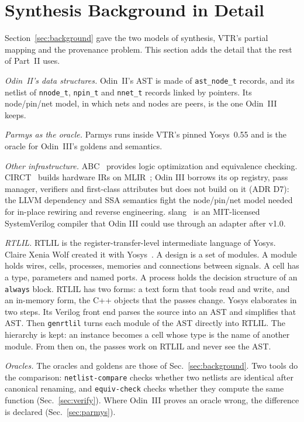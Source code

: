 \documentclass[conference]{IEEEtran}
\newcommand{\code}[1]{\texttt{#1}}
\begin{document}
\section{Synthesis Background in Detail}
\label{sec:background-detail}

Section~\ref{sec:background} gave the two models of synthesis, VTR's partial mapping and the
provenance problem. This section adds the detail that the rest of Part~II uses.

\emph{Odin~II's data structures.} Odin~II's AST is made of \code{ast\_node\_t} records, and its
netlist of \code{nnode\_t}, \code{npin\_t} and \code{nnet\_t} records linked by pointers. Its
node/pin/net model, in which nets and nodes are peers, is the one Odin~III keeps.

\emph{Parmys as the oracle.} Parmys runs inside VTR's pinned Yosys~0.55 and is the oracle for
Odin~III's goldens and semantics.

\emph{Other infrastructure.} ABC~ provides logic optimization and
equivalence checking. CIRCT~ builds hardware IRs on MLIR~;
Odin III borrows its op registry, pass manager, verifiers and first-class attributes but does not
build on it (ADR D7): the LLVM dependency and SSA semantics fight the node/pin/net model needed
for in-place rewiring and reverse engineering. slang~ is an MIT-licensed
SystemVerilog compiler that Odin III could use through an adapter after v1.0.

\emph{RTLIL.} RTLIL is the register-transfer-level intermediate language of Yosys. Claire Xenia
Wolf created it with Yosys~. A design is a set of modules. A module holds wires, cells,
processes, memories and connections between signals. A cell has a type, parameters and named
ports. A process holds the decision structure of an \code{always} block. RTLIL has two forms: a
text form that tools read and write, and an in-memory form, the C++ objects that the passes
change. Yosys elaborates in two steps. Its Verilog front end parses the source into an AST and
simplifies that AST. Then \code{genrtlil} turns each module of the AST directly into RTLIL.
The hierarchy is kept: an instance becomes a cell whose type is the name of another module. From
then on, the passes work on RTLIL and never see the AST.

\emph{Oracles.} The oracles and goldens are those of Sec.~\ref{sec:background}. Two tools do the
comparison: \code{netlist-compare} checks whether two netlists are identical after canonical
renaming, and \code{equiv-check} checks whether they compute the same function
(Sec.~\ref{sec:verify}). Where Odin~III proves an oracle wrong, the difference is declared
(Sec.~\ref{sec:parmys}).
\end{document}
